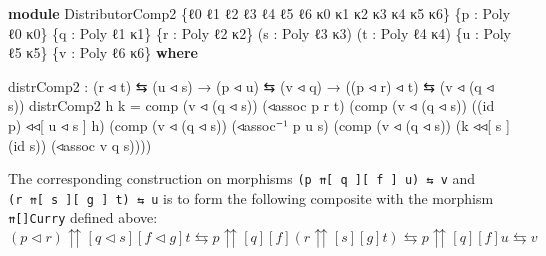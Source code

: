 \documentclass[
  11pt,
  oneside,
  article]{memoir}
\newenvironment{Shaded}{}{}
\newcommand{\KeywordTok}[1]{\textcolor[rgb]{0.00,0.44,0.13}{\textbf{#1}}}
\newcommand{\NormalTok}[1]{#1}
\newcommand{\OtherTok}[1]{\textcolor[rgb]{0.00,0.44,0.13}{#1}}
\theoremstyle{definition}
\theoremstyle{plain}
\newcommand{\0}{\textsf{0}}
\newcommand{\1}{\tn{\textsf{1}}}
\begin{document}
\begin{Shaded}
\begin{Highlighting}[]
\KeywordTok{module}\NormalTok{ DistributorComp2 }
           \OtherTok{\{}\NormalTok{ℓ0 ℓ1 ℓ2 ℓ3 ℓ4 ℓ5 ℓ6 κ0 κ1 κ2 κ3 κ4 κ5 κ6}\OtherTok{\}}
           \OtherTok{\{}\NormalTok{p }\OtherTok{:}\NormalTok{ Poly ℓ0 κ0}\OtherTok{\}} \OtherTok{\{}\NormalTok{q }\OtherTok{:}\NormalTok{ Poly ℓ1 κ1}\OtherTok{\}} 
           \OtherTok{\{}\NormalTok{r }\OtherTok{:}\NormalTok{ Poly ℓ2 κ2}\OtherTok{\}} \OtherTok{(}\NormalTok{s }\OtherTok{:}\NormalTok{ Poly ℓ3 κ3}\OtherTok{)}
           \OtherTok{(}\NormalTok{t }\OtherTok{:}\NormalTok{ Poly ℓ4 κ4}\OtherTok{)} \OtherTok{\{}\NormalTok{u }\OtherTok{:}\NormalTok{ Poly ℓ5 κ5}\OtherTok{\}} 
           \OtherTok{\{}\NormalTok{v }\OtherTok{:}\NormalTok{ Poly ℓ6 κ6}\OtherTok{\}} \KeywordTok{where} 

\NormalTok{    distrComp2 }\OtherTok{:} \OtherTok{(}\NormalTok{r ◃ t}\OtherTok{)}\NormalTok{ ⇆ }\OtherTok{(}\NormalTok{u ◃ s}\OtherTok{)} \OtherTok{→} \OtherTok{(}\NormalTok{p ◃ u}\OtherTok{)}\NormalTok{ ⇆ }\OtherTok{(}\NormalTok{v ◃ q}\OtherTok{)}
                 \OtherTok{→} \OtherTok{((}\NormalTok{p ◃ r}\OtherTok{)}\NormalTok{ ◃ t}\OtherTok{)}\NormalTok{ ⇆ }\OtherTok{(}\NormalTok{v ◃ }\OtherTok{(}\NormalTok{q ◃ s}\OtherTok{))}
\NormalTok{    distrComp2 h k }\OtherTok{=}
\NormalTok{        comp }\OtherTok{(}\NormalTok{v ◃ }\OtherTok{(}\NormalTok{q ◃ s}\OtherTok{))} \OtherTok{(}\NormalTok{◃assoc p r t}\OtherTok{)} 
             \OtherTok{(}\NormalTok{comp }\OtherTok{(}\NormalTok{v ◃ }\OtherTok{(}\NormalTok{q ◃ s}\OtherTok{))}  \OtherTok{((}\NormalTok{id p}\OtherTok{)}\NormalTok{ ◃◃[ u ◃ s ] h}\OtherTok{)} 
               \OtherTok{(}\NormalTok{comp }\OtherTok{(}\NormalTok{v ◃ }\OtherTok{(}\NormalTok{q ◃ s}\OtherTok{))} \OtherTok{(}\NormalTok{◃assoc⁻¹ p u s}\OtherTok{)} 
                     \OtherTok{(}\NormalTok{comp }\OtherTok{(}\NormalTok{v ◃ }\OtherTok{(}\NormalTok{q ◃ s}\OtherTok{))} \OtherTok{(}\NormalTok{k ◃◃[ s ] }\OtherTok{(}\NormalTok{id s}\OtherTok{))} 
                           \OtherTok{(}\NormalTok{◃assoc v q s}\OtherTok{))))}
\end{Highlighting}
\end{Shaded}

The corresponding construction on morphisms
\texttt{(p\ ⇈{[}\ q\ {]}{[}\ f\ {]}\ u)\ ⇆\ v} and
\texttt{(r\ ⇈{[}\ s\ {]}{[}\ g\ {]}\ t)\ ⇆\ u} is to form the following
composite with the morphism \texttt{⇈{[}{]}Curry} defined above: \[
(p \triangleleft r) {\upuparrows}[q \triangleleft s][f \triangleleft g] t \leftrightarrows p {\upuparrows}[q][f] (r {\upuparrows}[s][g] t) \leftrightarrows p {\upuparrows}[q][f] u \leftrightarrows v
\]
\end{document}
